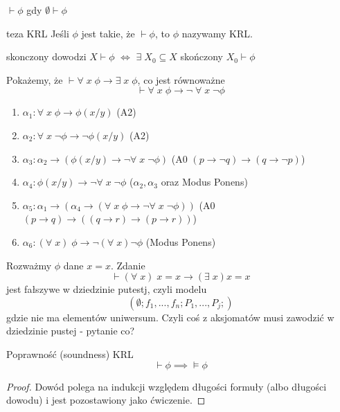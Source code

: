 \begin{konwencja}{}{}
  $\vdash \phi$ gdy $\emptyset\vdash\phi$
\end{konwencja}

\begin{definition}{teza KRL}{}
  Jeśli $\phi$ jest takie, że $\vdash\phi$, to $\phi$ nazywamy  KRL.
\end{definition}

\begin{remark}{}{skonczony dowodzi}
  $X\vdash \phi$ $\iff$ $\exists\;X_0\subseteq X$ skończony $X_0\vdash \phi$
\end{remark}

\begin{example}
  Pokażemy, że $\vdash \forall\;x\;\phi\to\exists\;x\;\phi$, co jest równoważne
  $$\vdash \forall\;x\;\phi\to \neg\;\forall\;x\;\neg\phi$$
  
  \begin{enumerate}
    \item $\alpha_1:\forall\;x\;\phi\to \phi(x/y)$ (A2)
    \item $\alpha_2:\forall\;x\;\neg\phi\to\neg\phi(x/y)$ (A2)
    \item $\alpha_3:\alpha_2\to (\phi(x/y)\to \neg\forall\;x\;\neg\phi)$ (A0 $(p\to\neg q)\to(q\to\neg p)$)
    \item $\alpha_4:\phi(x/y)\to\neg\forall\;x\;\neg\phi$ ($\alpha_2,\alpha_3$ oraz Modus Ponens)
    \item $\alpha_5:\alpha_1\to(\alpha_4\to (\forall\;x\;\phi\to\neg\forall\;x\;\neg\phi))$ (A0 $(p\to q)\to((q\to r)\to(p\to r))$)
    \item $\alpha_6:(\forall\;x)\;\phi\to\neg(\forall\;x)\neg\phi$ (Modus Ponens)
  \end{enumerate}
\end{example}

Rozważmy $\phi$ dane $x=x$. Zdanie
$$\vdash(\forall\;x)\;x=x\to(\exists\;x)x=x$$
jest fałszywe w dziedzinie putestj, czyli modelu
$$(\emptyset; f_1,...,f_n; P_1,...,P_j;)$$
gdzie nie ma elementów uniwersum. Czyli coś z aksjomatów musi zawodzić w dziedzinie pustej - pytanie co?


\begin{center}
\end{center}

\begin{remark}{}{}
  Poprawność (soundness) KRL
  $$\vdash\phi\implies \models\phi$$
\end{remark}
\begin{proof}
  Dowód polega na indukcji względem długości formuły (albo długości dowodu) i jest pozostawiony jako ćwiczenie.
\end{proof}

